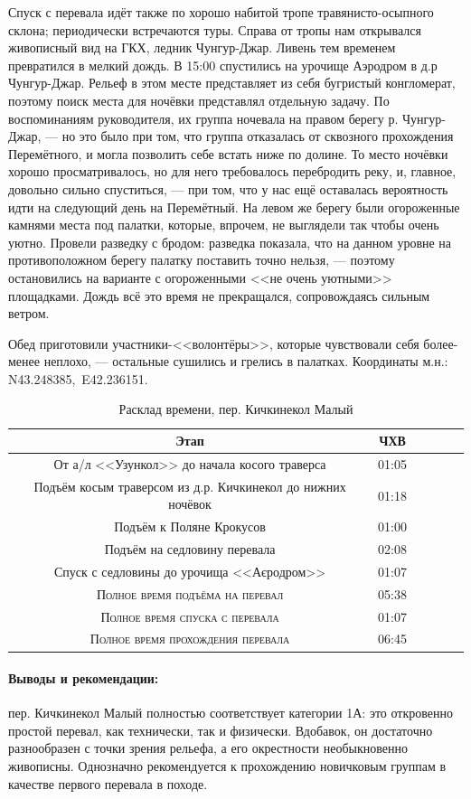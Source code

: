 Спуск с перевала идёт также по хорошо набитой тропе травянисто-осыпного склона; периодически встречаются туры. Справа от тропы нам открывался живописный вид на ГКХ, ледник Чунгур-Джар. Ливень тем временем превратился в мелкий дождь. В 15:00 спустились на урочище Аэродром в д.р Чунгур-Джар. Рельеф в этом месте представляет из себя бугристый конгломерат, поэтому поиск места для ночёвки представлял отдельную задачу. По воспоминаниям руководителя, их группа \cite{Korolyov2018} ночевала на правом берегу р. Чунгур-Джар, --- но это было при том, что группа отказалась от сквозного прохождения Перемётного, и могла позволить себе встать ниже по долине. То место ночёвки хорошо просматривалось, но для него требовалось перебродить реку, и, главное, довольно сильно спуститься, --- при том, что у нас ещё оставалась вероятность идти на следующий день на Перемётный. На левом же берегу были огороженные камнями места под палатки, которые, впрочем, не выглядели так чтобы очень уютно. Провели разведку с бродом: разведка показала, что на данном уровне на противоположном берегу палатку поставить точно нельзя, --- поэтому остановились на варианте с огороженными <<не очень уютными>> площадками. Дождь всё это время не прекращался, сопровождаясь сильным ветром.

Обед приготовили участники-<<волонтёры>>, которые чувствовали себя более-менее неплохо, --- остальные сушились и грелись в палатках. Координаты м.н.: N43.248385\degree,~E42.236151\degree.

\begin{table}[h!]
	\centering
	\begin{tabular}{|c|c|c|c|c|c|} 
		\hline 
		Этап & ЧХВ \\ 	
		\hline 
		От а/л <<Узункол>> до начала косого траверса  & 01:05 \\
		Подъём косым траверсом из д.р. Кичкинекол до нижних ночёвок  & 01:18 \\
		Подъём к Поляне Крокусов & 01:00\\ 
		Подъём на седловину перевала & 02:08\\ 
		Спуск с седловины до урочища <<Аєродром>> & 01:07 \\
		
		\hline
		\textsc{Полное время подъёма на перевал  }& 05:38\\
		\textsc{Полное время спуска с перевала }& 01:07 \\
		\textsc{Полное время прохождения перевала }& 06:45 \\
		\hline
	\end{tabular}
	\caption{Расклад времени, пер. Кичкинекол Малый}
\end{table}

\paragraph{Выводы и рекомендации:} пер. Кичкинекол Малый полностью соответствует категории 1А: это откровенно простой перевал, как технически, так и физически. Вдобавок, он достаточно разнообразен с точки зрения рельефа, а его окрестности необыкновенно живописны. Однозначно рекомендуется к прохождению новичковым группам в качестве первого перевала в походе. 
\clearpage